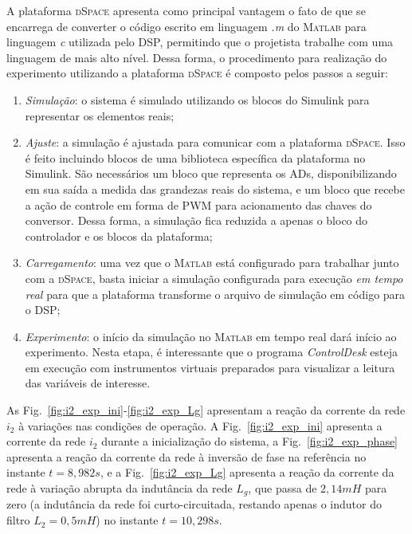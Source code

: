   A plataforma \textsc{dSpace} apresenta como principal vantagem o fato de que se encarrega de converter o código escrito em linguagem \emph{.m} do \textsc{Matlab} para linguagem \emph{c} utilizada pelo DSP, permitindo que o projetista trabalhe com uma linguagem de mais alto nível. Dessa forma, o procedimento para realização do experimento utilizando a plataforma \textsc{dSpace} é composto pelos passos a seguir:
  \begin{enumerate}
    \item \textit{Simulação}: o sistema é simulado utilizando os blocos do Simulink para representar os elementos reais;
    \item \textit{Ajuste}: a simulação é ajustada para comunicar com a plataforma \textsc{dSpace}. Isso é feito incluindo blocos de uma biblioteca específica da plataforma no Simulink. São necessários um bloco que representa os ADs, disponibilizando em sua saída a medida das grandezas reais do sistema, e um bloco que recebe a ação de controle em forma de PWM para acionamento das chaves do conversor. Dessa forma, a simulação fica reduzida a apenas o bloco do controlador e os blocos da plataforma;
    \item \textit{Carregamento}: uma vez que o \textsc{Matlab} está configurado para trabalhar junto com a \textsc{dSpace}, basta iniciar a simulação configurada para execução \emph{em tempo real} para que a plataforma transforme o arquivo de simulação em código para o DSP;
    \item \textit{Experimento}: o início da simulação no \textsc{Matlab} em tempo real dará início ao experimento. Nesta etapa, é interessante que o programa \emph{ControlDesk} esteja em execução com instrumentos virtuais preparados para visualizar a leitura das variáveis de interesse.
  \end{enumerate}

  As Fig.~\ref{fig:i2_exp_ini}-\ref{fig:i2_exp_Lg} apresentam a reação da corrente da rede $i_2$ à variações nas condições de operação. A Fig.~\ref{fig:i2_exp_ini} apresenta a corrente da rede $i_2$ durante a inicialização do sistema, a Fig.~\ref{fig:i2_exp_phase} apresenta a reação da corrente da rede à inversão de fase na referência no instante $t=8,982 s$, e a Fig.~\ref{fig:i2_exp_Lg} apresenta a reação da corrente da rede à variação abrupta da indutância da rede $L_g$, que passa de $2,14mH$ para zero (a indutância da rede foi curto-circuitada, restando apenas o indutor do filtro $L_2 = 0,5mH$) no instante $t=10,298 s$.

  \vfill
  \noindent
  \begin{minipage}{\textwidth}
    \makebox[\textwidth]{
      \centering
      \def\svgwidth{\textwidth}
      }
    \label{fig:i2_exp_ini}
  \end{minipage}
  \vfill

